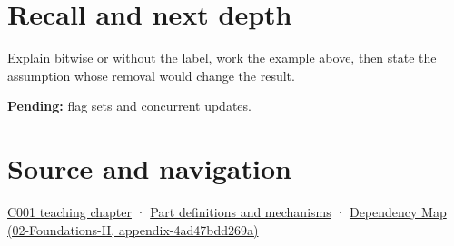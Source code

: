 \section{Recall and next depth}\label{appendix-a427ce8ce8a6-recall-and-next-depth}

Explain bitwise or without the label, work the example above, then state the assumption whose removal would change the result.

\textbf{Pending:} flag sets and concurrent updates.

\section{Source and navigation}\label{appendix-a427ce8ce8a6-source-and-navigation}

\href{Continuous\%20Notes/Computing\%20Foundations\%20-\%20From\%20Bits\%20to\%20C++\%20and\%20Systems\%20APIs\#From\%20a\%20signal\%20to\%20an\%20interpretation}{C001 teaching chapter} · \hyperref[appendix-fd090d982a15]{Part definitions and mechanisms} · \href{../02-Foundations-II/main.pdf\#nameddest=appendix-4ad47bdd269a}{Dependency Map (02-Foundations-II, appendix-4ad47bdd269a)}
